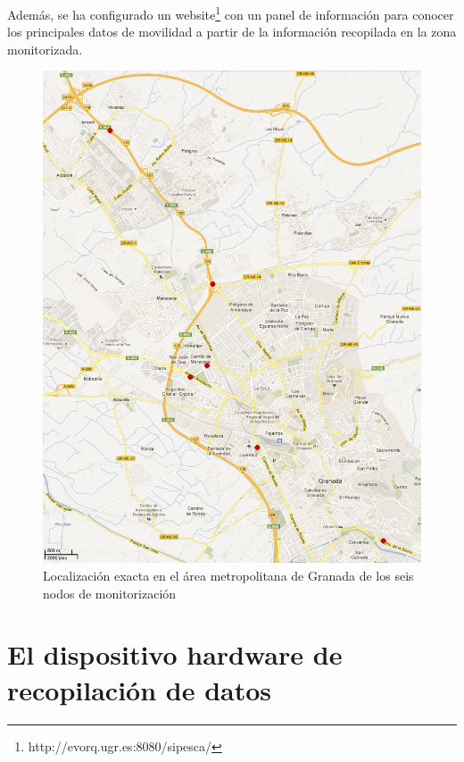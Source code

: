 \documentclass[twocolumn,twoside]{Jornadas}
\begin{document}
Además, se ha configurado un
website\footnote{http://evorq.ugr.es:8080/sipesca/} con un panel de
información para conocer los principales datos de movilidad a partir
de la información recopilada en la zona monitorizada. %


\begin{figure}[htpb] 
\begin{center} 
\includegraphics[scale=0.40]{mapa.png}
\end{center} 
\caption{Localización exacta en el área metropolitana de Granada de los seis nodos de monitorización} 
\label{mapa} 
\end{figure}




\section{El dispositivo hardware de recopilación de datos}
\label{hw}
\end{document}
